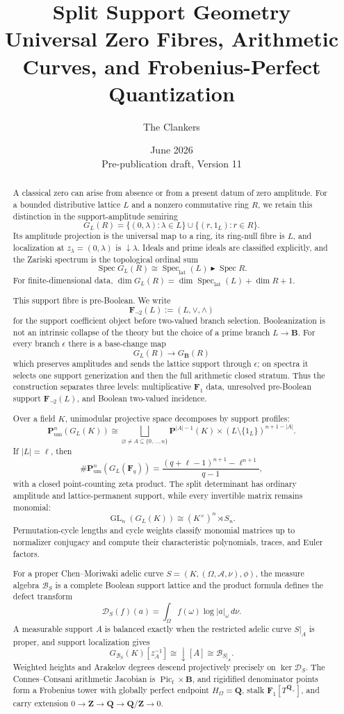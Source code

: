 \documentclass[11pt]{amsart}
\title[Split Support Geometry]
{Split Support Geometry\\[4pt]
\large Universal Zero Fibres, Arithmetic Curves, and Frobenius-Perfect Quantization}
\author{The Clankers}
\date{June 2026\\Pre-publication draft, Version 11}
\numberwithin{equation}{section}
\theoremstyle{definition}
\newcommand{\Fnot}{\mathbf F_{\neg 2}}
\newcommand{\Spec}{\operatorname{Spec}}
\newcommand{\GL}{\operatorname{GL}}
\newcommand{\Pum}{\mathbf P_{\mathrm{um}}}
\newcommand{\SpecLat}{\operatorname{Spec}_{\mathrm{lat}}}
\begin{document}
\begin{abstract}
A classical zero can arise from absence or from a present datum of zero
amplitude.  For a bounded distributive lattice $L$ and a nonzero
commutative ring $R$, we retain this distinction in the support-amplitude
semiring
\[
G_L(R)=\{(0,\lambda):\lambda\in L\}\cup\{(r,1_L):r\in R\}.
\]
Its amplitude projection is the universal map to a ring, its ring-null
fibre is $L$, and localization at $z_\lambda=(0,\lambda)$ is
$\downarrow\lambda$.  Ideals and prime ideals are classified explicitly,
and the Zariski spectrum is the topological ordinal sum
\[
\Spec G_L(R)\cong\SpecLat(L)\blacktriangleright\Spec R.
\]
For finite-dimensional data,
$\dim G_L(R)=\dim\SpecLat(L)+\dim R+1$.

This support fibre is pre-Boolean.  We write
\[
\Fnot(L):=(L,\vee,\wedge)
\]
for the support coefficient object before two-valued branch selection.
Booleanization is not an intrinsic collapse of the theory but the choice of
a prime branch $L\to\mathbf B$.  For every branch $\epsilon$ there is a
base-change map
\[
G_L(R)\longrightarrow G_{\mathbf B}(R)
\]
which preserves amplitudes and sends the lattice support through
$\epsilon$; on spectra it selects one support generization and then the
full arithmetic closed stratum.  Thus the construction separates three
levels: multiplicative $\mathbf F_1$ data, unresolved pre-Boolean support
$\Fnot(L)$, and Boolean two-valued incidence.

Over a field $K$, unimodular projective space decomposes by support
profiles:
\[
\Pum^n(G_L(K))\cong
\bigsqcup_{\varnothing\neq A\subseteq\{0,\dots,n\}}
\mathbf P^{|A|-1}(K)\times(L\setminus\{1_L\})^{n+1-|A|}.
\]
If $|L|=\ell$, then
\[
\#\Pum^n(G_L(\mathbf F_q))
=\frac{(q+\ell-1)^{n+1}-\ell^{n+1}}{q-1},
\]
with a closed point-counting zeta product.  The split determinant has
ordinary amplitude and lattice-permanent support, while every invertible
matrix remains monomial:
\[
\GL_n(G_L(K))\cong(K^\times)^n\rtimes S_n.
\]
Permutation-cycle lengths and cycle weights classify monomial matrices up
to normalizer conjugacy and compute their characteristic polynomials,
traces, and Euler factors.

For a proper Chen--Moriwaki adelic curve
$S=(K,(\Omega,\mathcal A,\nu),\phi)$, the measure algebra
$\mathscr B_S$ is a complete Boolean support lattice and the product
formula defines the defect transform
\[
\mathscr D_S(f)(a)=\int_\Omega f(\omega)\log|a|_\omega\,d\nu.
\]
A measurable support $A$ is balanced exactly when the restricted adelic
curve $S|_A$ is proper, and support localization gives
\[
G_{\mathscr B_S}(K)[z_A^{-1}]
\cong\downarrow[A]\cong\mathscr B_{S|_A}.
\]
Weighted heights and Arakelov degrees descend projectively precisely on
$\ker\mathscr D_S$.  The Connes--Consani arithmetic Jacobian is
$\operatorname{Pic}_{\mathrm f}\times\mathbf B$, and rigidified
denominator points form a Frobenius tower with globally perfect endpoint
$H_\Omega=\mathbf Q$, stalk $\mathbf F_1[T^{\mathbf Q_+}]$, and carry
extension $0\to\mathbf Z\to\mathbf Q\to\mathbf Q/\mathbf Z\to0$.


\end{abstract}
\end{document}
